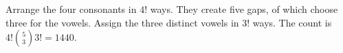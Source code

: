 Arrange the four consonants in $4!$ ways. They create five gaps, of which choose three for the vowels. Assign the three distinct vowels in $3!$ ways. The count is $4!\binom53 3!=\boxed{1440}$.
